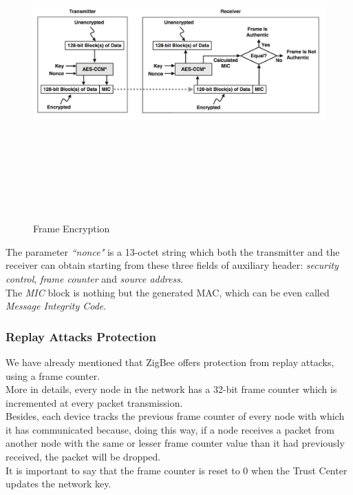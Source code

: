 \documentclass[12pt]{report}
\begin{document}
{\begin{figure}[H]
\includegraphics[width=11.5cm,height=12cm,keepaspectratio]{frame_encryption}
\centering
\caption{Frame Encryption}
\end{figure}

The parameter \emph{``nonce"} is a 13-octet string which both the transmitter and the receiver can obtain starting from these three fields of auxiliary header: \emph{security control}, \emph{frame counter} and \emph{source address}.\\
The \emph{MIC} block is nothing but the generated MAC, which can be even called \emph{Message Integrity Code}.

\subsubsection{Replay Attacks Protection}
\bigskip
We have already mentioned that ZigBee offers protection from replay attacks, using a frame counter.\\
More in details, every node in the network has a 32-bit frame counter which is incremented at every packet transmission.\\
Besides, each device tracks the previous frame counter of every node with which it has communicated because, doing this way, if a node receives a packet from another node with the same or lesser frame counter value than it had previously received, the packet will be dropped.\\
It is important to say that the frame counter is reset to 0 when the Trust Center updates the network key.

}
\end{document}
